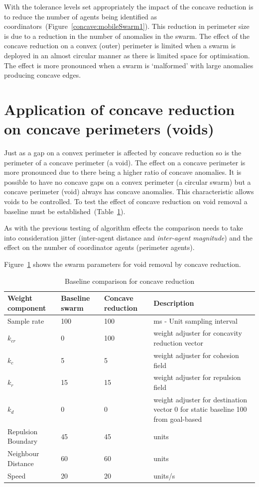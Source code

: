 With the tolerance levels set appropriately the impact of the concave reduction is to reduce the number of agents being identified as coordinators~(Figure~\ref{concave:mobileSwarm1}). This reduction in perimeter size is due to a reduction in the number of anomalies in the swarm. The effect of the concave reduction on a convex (outer) perimeter is limited when a swarm is deployed in an almost circular manner as there is limited space for optimisation. The effect is more pronounced when a swarm is `malformed' with large anomalies producing concave edges.

\section{Application of concave reduction on concave perimeters (voids)}\label{sec:ApplicationConcavePerimeters}
Just as a gap on a convex perimeter is affected by concave reduction so is the perimeter of a concave perimeter (a void). The effect on a concave perimeter is more pronounced due to there being a higher ratio of concave anomalies. It is possible to have no concave gaps on a convex perimeter (a circular swarm) but a concave perimeter (void) always has concave anomalies. This characteristic allows voids to be controlled. To test the effect of concave reduction on void removal a baseline must be established~(Table~\ref{tab:BaselineConcaveReduction3}).

As with the previous testing of algorithm effects the comparison needs to take into consideration jitter (inter-agent distance and \textit{inter-agent magnitude}) and the effect on the number of coordinator agents (perimeter agents). 

Figure~\ref{tab:BaselineConcaveReduction3} shows the swarm parameters for void removal by concave reduction.

\begin{table}[H]
\begin{center}
\begin{tabular}{| p{2.3cm} | p{2cm} | p{2cm} | p{5cm} |}
\hline
\bf Weight \bf component & \bf Baseline \bf swarm & \bf Concave \bf reduction & \bf Description \\ \hline
Sample rate & 100 & 100 & ms - Unit sampling interval\\  \hline
$k_{cr}$ & 0 & 100 & weight adjuster for concavity reduction vector\\  \hline
$k_c$ & 5 & 5 & weight adjuster for cohesion field\\  \hline
$k_r$ & 15 & 15 & weight adjuster for repulsion field\\  \hline
$k_d$ & 0 & 0 & weight adjuster for destination vector 0 for static baseline 100 from goal-based\\  \hline
Repulsion Boundary & 45 & 45 & units\\  \hline
Neighbour Distance & 60 & 60 & units\\  \hline
Speed & 20 & 20 & units/s\\  \hline
\end{tabular}\caption{Baseline comparison for concave reduction} \label{tab:BaselineConcaveReduction3}
\end{center}
\end{table}


